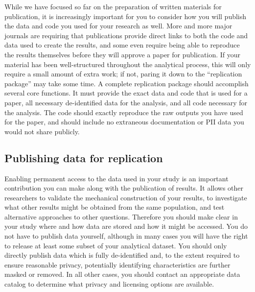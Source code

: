 While we have focused so far on the preparation of written materials for publication,
it is increasingly important for you to consider how you will publish
the data and code you used for your research as well.
More and more major journals are requiring that publications
provide direct links to both the code and data used to create the results,
and some even require being able to reproduce the results themselves
before they will approve a paper for publication.
If your material has been well-structured throughout the analytical process,
this will only require a small amount of extra work;
if not, paring it down to the ``replication package'' may take some time.
A complete replication package should accomplish several core functions.
It must provide the exact data and code that is used for a paper,
all necessary de-identified data for the analysis,
and all code necessary for the analysis.
The code should exactly reproduce the raw outputs you have used for the paper,
and should include no extraneous documentation or PII data you would not share publicly.

\subsection{Publishing data for replication}

Enabling permanent access to the data used in your study
is an important contribution you can make along with the publication of results.
It allows other researchers to validate the mechanical construction of your results,
to investigate what other results might be obtained from the same population,
and test alternative approaches to other questions.
Therefore you should make clear in your study
where and how data are stored and how it might be accessed.
You do not have to publish data yourself,
although in many cases you will have the right to release
at least some subset of your analytical dataset.
You should only directly publish data which is fully de-identified
and, to the extent required to ensure reasonable privacy,
potentially identifying characteristics are further masked or removed.
In all other cases, you should contact an appropriate data catalog
to determine what privacy and licensing options are available.

